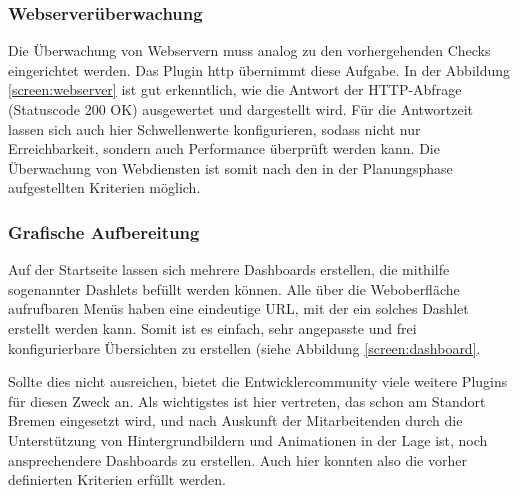 \subsubsection{Webserverüberwachung}
\label{sec:ÜberwachungWebserver}
Die Überwachung von Webservern muss analog zu den vorhergehenden Checks eingerichtet werden. Das Plugin \glqq{}http\grqq{} übernimmt diese Aufgabe.  In der Abbildung \ref{screen:webserver} ist gut erkenntlich, wie die Antwort der \ac{HTTP}-Abfrage (Statuscode 200 OK) ausgewertet und dargestellt wird. Für die Antwortzeit lassen sich auch hier Schwellenwerte konfigurieren, sodass nicht nur Erreichbarkeit, sondern auch Performance überprüft werden kann. Die Überwachung von Webdiensten ist somit nach den in der Planungsphase aufgestellten Kriterien möglich.

\subsubsection{Grafische Aufbereitung}
\label{sec:GrafischeAufbereitung}
Auf der Startseite lassen sich mehrere Dashboards erstellen, die mithilfe sogenannter \glqq{}Dashlets\grqq{} befüllt werden können. Alle über die Weboberfläche aufrufbaren Menüs haben eine eindeutige \ac{URL}, mit der ein solches Dashlet erstellt werden kann. Somit ist es einfach, sehr angepasste  und frei konfigurierbare Übersichten zu erstellen (siehe Abbildung \ref{screen:dashboard}.

Sollte dies nicht ausreichen, bietet die Entwicklercommunity viele weitere Plugins für diesen Zweck an. Als wichtigstes ist hier  vertreten, das schon am Standort Bremen eingesetzt wird, und nach Auskunft der Mitarbeitenden durch die Unterstützung von Hintergrundbildern und Animationen in der Lage ist, noch ansprechendere Dashboards zu erstellen. Auch hier konnten also die vorher definierten Kriterien erfüllt werden.